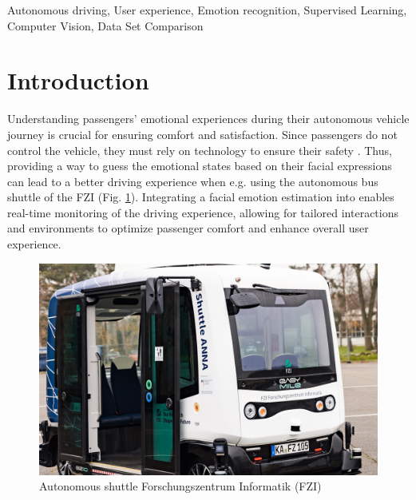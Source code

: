 \documentclass[conference]{IEEEtran}
\begin{document}
\begin{IEEEkeywords}
    Autonomous driving, User experience, Emotion recognition, Supervised Learning, Computer Vision, Data Set Comparison
\end{IEEEkeywords}

\section{Introduction}
Understanding passengers' emotional experiences during their autonomous vehicle journey is crucial for ensuring comfort and satisfaction. Since passengers do not control the vehicle, they must rely on technology to ensure their safety \cite{EkoAgus}. Thus, providing a way to guess the emotional states based on their facial expressions can lead to a better driving experience when e.g. using the autonomous bus shuttle of the FZI (Fig. \ref{FZI}). Integrating a facial emotion estimation into enables real-time monitoring of the driving experience, allowing for tailored interactions and environments to optimize passenger comfort and enhance overall user experience. 

\begin{figure}[ht]
    \centering
    \includegraphics[width= \columnwidth]{pictures/Shuttle ganz.jpg}
    \caption{Autonomous shuttle Forschungszentrum Informatik (FZI)}
    \label{FZI}
\end{figure}
\end{document}

